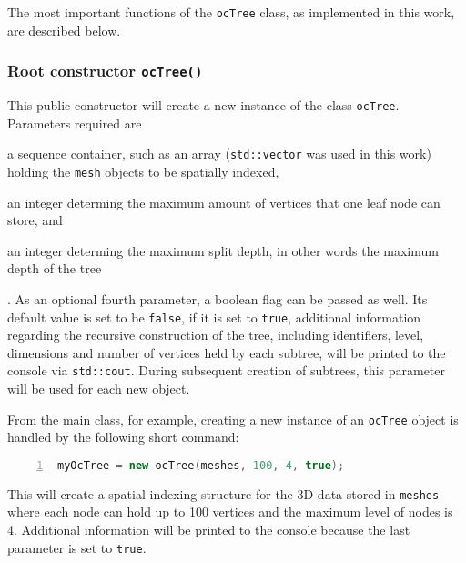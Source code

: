 The most important functions of the \texttt{ocTree} class, as implemented in this work, are described below.

\subsubsection{Root constructor \texttt{ocTree()}}
	This public constructor will create a new instance of the class \texttt{ocTree}. Parameters required are
	\begin{enumerate*}
		\item a sequence container, such as an array (\texttt{std::vector} was used in this work) holding the \texttt{mesh} objects to be spatially indexed,
		\item an integer determing the maximum amount of vertices that one leaf node can store, and
		\item an integer determing the maximum split depth, in other words the maximum depth of the tree
	\end{enumerate*}.
	As an optional fourth parameter, a boolean flag can be passed as well. Its default value is set to be \texttt{false}, if it is set to \texttt{true}, additional information regarding the recursive construction of the tree, including identifiers, level, dimensions and number of vertices held by each subtree, will be printed to the console via \texttt{std::cout}. During subsequent creation of subtrees, this parameter will be used for each new object.

From the main class, for example, creating a new instance of an \texttt{ocTree} object is handled by the following short command:

\begin{minipage}{\linewidth}
\begin{lstlisting}[language=C++,numberstyle=\zebra{black!5}{white}{},numbers=left,xleftmargin=2em,tabsize=3]
myOcTree = new ocTree(meshes, 100, 4, true);
\end{lstlisting}
\end{minipage}

This will create a spatial indexing structure for the 3D data stored in \texttt{meshes} where each node can hold up to 100 vertices and the maximum level of nodes is 4. Additional information will be printed to the console because the last parameter is set to \texttt{true}.

